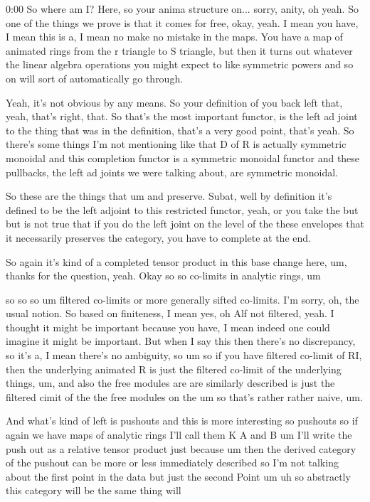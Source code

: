 \begin{unfinished}{0:00}
So where am I? Here, so your anima structure on... sorry, anity, oh yeah. So one of the things we prove is that it comes for free, okay, yeah. I mean you have, I mean this is a, I mean no make no mistake in the maps. You have a map of animated rings from the r triangle to S triangle, but then it turns out whatever the linear algebra operations you might expect to like symmetric powers and so on will sort of automatically go through. 

Yeah, it's not obvious by any means. So your definition of you back left that, yeah, that's right, that. So that's the most important functor, is the left ad joint to the thing that was in the definition, that's a very good point, that's yeah. So there's some things I'm not mentioning like that D of R is actually symmetric monoidal and this completion functor is a symmetric monoidal functor and these pullbacks, the left ad joints we were talking about, are symmetric monoidal. 

So these are the things that um and preserve. Subat, well by definition it's defined to be the left adjoint to this restricted functor, yeah, or you take the but but is not true that if you do the left joint on the level of the these envelopes that it necessarily preserves the category, you have to complete at the end. 

So again it's kind of a completed tensor product in this base change here, um, thanks for the question, yeah. Okay so so co-limits in analytic rings, um

 so so so um filtered co-limits or more generally sifted co-limits. I'm sorry, oh, the usual notion. So based on finiteness, I mean yes, oh Alf not filtered, yeah. I thought it might be important because you have, I mean indeed one could imagine it might be important. But when I say this then there's no discrepancy, so it's a, I mean there's no ambiguity, so um so if you have filtered co-limit of RI, then the underlying animated R is just the filtered co-limit of the underlying things, um, and also the free modules are are similarly described is just the filtered cimit of the the free modules on the um so that's rather rather naive, um. 

And what's kind of left is pushouts and this is more interesting so pushouts so if again we have maps of analytic rings I'll call them K A and B um I'll write the push out as a relative tensor product just because um then the derived category of the pushout can be more or less immediately described so I'm not talking about the first point in the data but just the second Point um uh so abstractly this category will be the same thing will


\end{unfinished}
